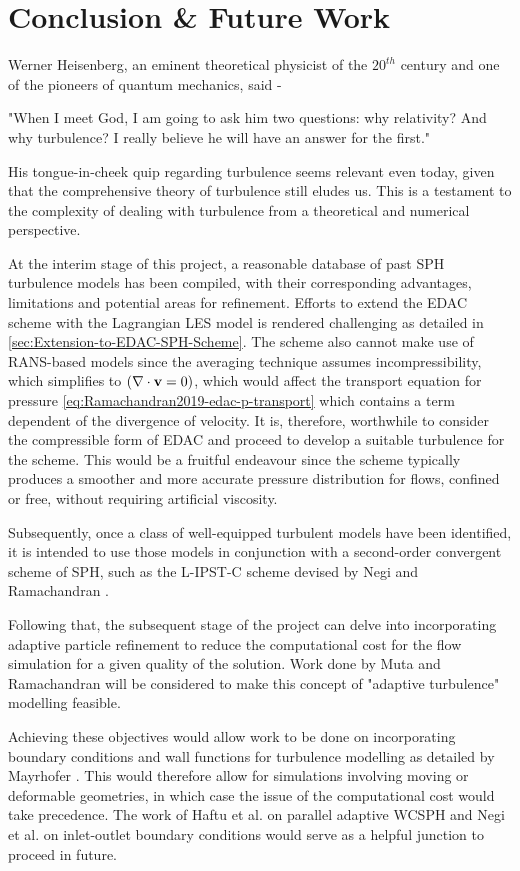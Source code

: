 \chapter{Conclusion \& Future Work} %
\label{Chapter4}

Werner Heisenberg, an eminent theoretical physicist of the $20^{th}$ century and one of the pioneers of quantum mechanics, said -
\begin{displayquote}
    "When I meet God, I am going to ask him two questions: why relativity? And why turbulence? I really believe he will have an answer for the first."
\end{displayquote}
His tongue-in-cheek quip regarding turbulence seems relevant even today, given that the comprehensive theory of turbulence still eludes us. This is a testament to the complexity of dealing with turbulence from a theoretical and numerical perspective. 

At the interim stage of this project, a reasonable database of past SPH turbulence models has been compiled, with their corresponding advantages, limitations and potential areas for refinement.
Efforts to extend the EDAC scheme \parencite{Ramachandran2019} with the Lagrangian LES model is rendered challenging as detailed in \ref{sec:Extension-to-EDAC-SPH-Scheme}. The scheme also cannot make use of RANS-based models since the averaging technique assumes incompressibility, which simplifies to $(\nabla \cdot \mathbf{v} = 0)$, which would affect the transport equation for pressure \ref{eq:Ramachandran2019-edac-p-transport} which contains a term dependent of the divergence of velocity. It is, therefore, worthwhile to consider the compressible form of EDAC \parencite{Chola2021} and proceed to develop a suitable turbulence for the scheme. This would be a fruitful endeavour since the scheme typically produces a smoother and more accurate pressure distribution for flows, confined or free, without requiring artificial viscosity.

Subsequently, once a class of well-equipped turbulent models have been identified, it is intended to use those models in conjunction with a second-order convergent scheme of SPH, such as the L-IPST-C scheme devised by Negi and Ramachandran \parencite{Negi2022Techniques}. 

Following that, the subsequent stage of the project can delve into incorporating adaptive particle refinement to reduce the computational cost for the flow simulation for a given quality of the solution. Work done by Muta and Ramachandran \parencite{Muta2022} will be considered to make this concept of "adaptive turbulence" modelling feasible.

Achieving these objectives would allow work to be done on incorporating boundary conditions and wall functions for turbulence modelling as detailed by Mayrhofer \parencite{Mayrhofer2014}. 
This would therefore allow for simulations involving moving or deformable geometries, in which case the issue of the computational cost would take precedence. The work of Haftu et al. \parencite{Haftu2022} on parallel adaptive WCSPH and Negi et al. \parencite{negi2020improved} on inlet-outlet boundary conditions would serve as a helpful junction to proceed in future.
